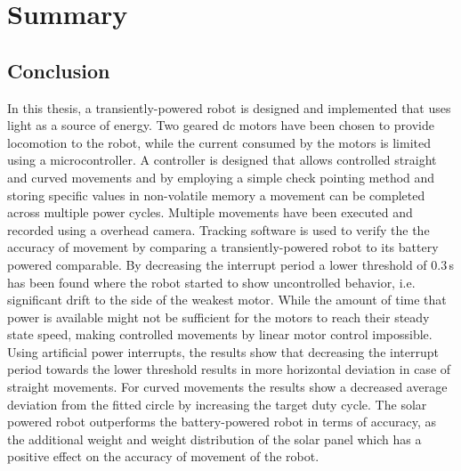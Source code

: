 \chapter{Summary}
\label{chp:summary}


\section{Conclusion}
\label{sec:conclusion}

In this thesis, a transiently-powered robot is designed and implemented that uses light as a source of energy.
Two geared dc motors have been chosen to provide locomotion to the robot, while the current consumed by the motors is limited using a microcontroller.
A controller is designed that allows controlled straight and curved movements and by employing a simple check pointing method and storing specific values in non-volatile memory a movement can be completed across multiple power cycles.
Multiple movements have been executed and recorded using a overhead camera.
Tracking software is used to verify the the accuracy of movement by comparing a transiently-powered robot to its battery powered comparable.
By decreasing the interrupt period a lower threshold of 0.3\,s has been found where the robot started to show uncontrolled behavior, i.e. significant drift to the side of the weakest motor.
While the amount of time that power is available might not be sufficient for the motors to reach their steady state speed, making controlled movements by linear motor control impossible.
Using artificial power interrupts, the results show that decreasing the interrupt period towards the lower threshold results in more horizontal deviation in case of straight movements.
For curved movements the results show a decreased average deviation from the fitted circle by increasing the target duty cycle.
The solar powered robot outperforms the battery-powered robot in terms of accuracy, as the additional weight and weight distribution of the solar panel which has a positive effect on the accuracy of movement of the robot.


